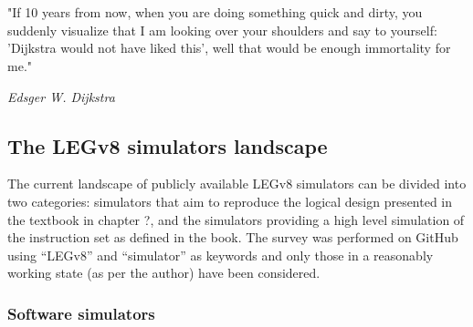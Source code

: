 \chapter{}

\epigraph{"If 10 years from now, when you are doing something quick and dirty, you suddenly visualize that I am looking over your shoulders and say to yourself: 'Dijkstra would not have liked this', well that would be enough immortality for me."}{\textit{Edsger W. Dijkstra}}

\section*{The LEGv8 simulators landscape}

The current landscape of publicly available LEGv8 simulators can be divided into two categories: simulators that aim to reproduce the logical design presented in the textbook in chapter ?, and the simulators providing a high level simulation of the instruction set as defined in the book.
The survey was performed on GitHub using ``LEGv8'' and ``simulator'' as keywords and only those in a reasonably working state (as per the author) have been considered.

\subsection*{Software simulators}

